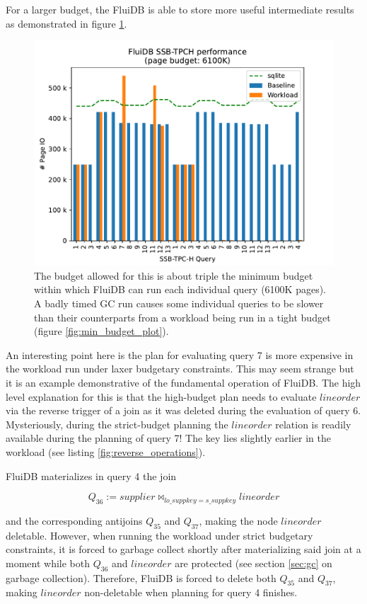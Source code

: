 For a larger budget, the FluiDB is able to store more useful
intermediate results as demonstrated in figure
\ref{fig:large_budget_plot}.

\begin{figure}[H]
  \centering
  \includegraphics[width=.9\linewidth]{./plans/workload_6100K.pdf}
  \caption{\label{fig:large_budget_plot} \ioperfdescr The budget
    allowed for this is about triple the minimum budget within which
    FluiDB can run each individual query (6100K pages). A badly timed GC
    run causes some individual queries to be slower than their
    counterparts from a workload being run in a tight budget (figure
    \ref{fig:min_budget_plot}).}
\end{figure}

An interesting point here is the plan for evaluating query 7 is more
expensive in the workload run under laxer budgetary constraints. This
may seem strange but it is an example demonstrative of the fundamental
operation of FluiDB. The high level explanation for this is that the
high-budget plan needs to evaluate \(\mathit{lineorder}\) via the
reverse trigger of a join as it was deleted during the evaluation of
query 6. Mysteriously, during the strict-budget planning the
\(\mathit{lineorder}\) relation is readily available during the
planning of query 7! The key lies slightly earlier in the workload
(see listing \ref{fig:reverse_operations}).

FluiDB materializes in query 4 the join

\[
  Q_{36} := \mathit{supplier} \Join_{\mathit{lo\_suppkey} = \mathit{s\_suppkey}} \mathit{lineorder}
\]

and the corresponding antijoins \(Q_{35}\) and \(Q_{37}\), making the
node \(\mathit{lineorder}\) deletable. However, when running the
workload under strict budgetary constraints, it is forced to garbage
collect shortly after materializing said join at a moment while both
\(Q_{36}\) and \(\mathit{lineorder}\) are protected (see section
\ref{sec:gc} on garbage collection). Therefore, FluiDB is forced to
delete both \(Q_{35}\) and \(Q_{37}\), making \(\mathit{lineorder}\)
non-deletable when planning for query 4 finishes.


